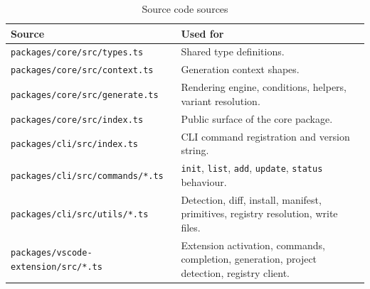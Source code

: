 \begin{longtable}{p{6.2cm}p{8cm}}
\caption{Source code sources}\\
\toprule
\textbf{Source} & \textbf{Used for} \\
\midrule

\texttt{packages/core/src/types.ts} & Shared type definitions. \\
\texttt{packages/core/src/context.ts} & Generation context shapes. \\
\texttt{packages/core/src/generate.ts} & Rendering engine, conditions, helpers,
variant resolution. \\
\texttt{packages/core/src/index.ts} & Public surface of the core package. \\
\texttt{packages/cli/src/index.ts} & CLI command registration and version string. \\
\texttt{packages/cli/src/commands/*.ts} & \texttt{init}, \texttt{list},
\texttt{add}, \texttt{update}, \texttt{status} behaviour. \\
\texttt{packages/cli/src/utils/*.ts} & Detection, diff, install, manifest,
primitives, registry resolution, write files. \\
\texttt{packages/vscode-extension/src/*.ts} & Extension activation, commands,
completion, generation, project detection, registry client. \\
\bottomrule
\end{longtable}

